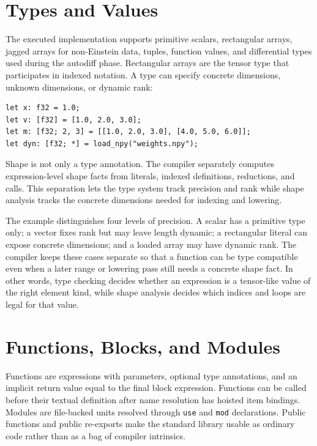 \section{Types and Values}

The executed implementation supports primitive scalars, rectangular arrays,
jagged arrays for non-Einstein data, tuples, function values, and differential
types used during the autodiff phase. Rectangular arrays are the tensor type
that participates in indexed notation. A type can specify concrete dimensions,
unknown dimensions, or dynamic rank:

\begin{lstlisting}[style=einlang]
let x: f32 = 1.0;
let v: [f32] = [1.0, 2.0, 3.0];
let m: [f32; 2, 3] = [[1.0, 2.0, 3.0], [4.0, 5.0, 6.0]];
let dyn: [f32; *] = load_npy("weights.npy");
\end{lstlisting}

Shape is not only a type annotation. The compiler separately computes
expression-level shape facts from literals, indexed definitions, reductions,
and calls. This separation lets the type system track precision and rank while
shape analysis tracks the concrete dimensions needed for indexing and lowering.

The example distinguishes four levels of precision. A scalar has a primitive
type only; a vector fixes rank but may leave length dynamic; a rectangular
literal can expose concrete dimensions; and a loaded array may have dynamic
rank. The compiler keeps these cases separate so that a function can be type
compatible even when a later range or lowering pass still needs a concrete
shape fact. In other words, type checking decides whether an expression is a
tensor-like value of the right element kind, while shape analysis decides which
indices and loops are legal for that value.

\section{Functions, Blocks, and Modules}

Functions are expressions with parameters, optional type annotations, and an
implicit return value equal to the final block expression. Functions can be
called before their textual definition after name resolution has hoisted item
bindings. Modules are file-backed units resolved through \texttt{use} and
\texttt{mod} declarations. Public functions and public re-exports make the
standard library usable as ordinary \einlang{} code rather than as a bag of
compiler intrinsics.

